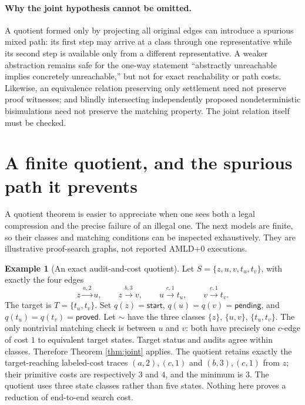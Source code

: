 \documentclass[11pt,letterpaper]{article}
\theoremstyle{definition}
\newtheorem{example}[theorem]{Example}
\begin{document}
\paragraph{Why the joint hypothesis cannot be omitted.} A quotient formed only by projecting all original edges can introduce a spurious mixed path: its first step may arrive at a class through one representative while its second step is available only from a different representative. A weaker abstraction remains safe for the one-way statement ``abstractly unreachable implies concretely unreachable,'' but not for exact reachability or path costs. Likewise, an equivalence relation preserving only settlement need not preserve proof witnesses; and blindly intersecting independently proposed nondeterministic bisimulations need not preserve the matching property. The joint relation itself must be checked.

\section{A finite quotient, and the spurious path it prevents}\label{sec:finite-case}
A quotient theorem is easier to appreciate when one sees both a legal compression and the precise failure of an illegal one. The next models are finite, so their classes and matching conditions can be inspected exhaustively. They are illustrative proof-search graphs, not reported AMLD+0 executions.

\begin{example}[An exact audit-and-cost quotient]\label{ex:finite-positive}
Let $S=\{z,u,v,t_u,t_v\}$, with exactly the four edges
\[
 z\xrightarrow{a,2}u,\qquad z\xrightarrow{b,3}v,
 \qquad u\xrightarrow{c,1}t_u,\qquad v\xrightarrow{c,1}t_v.
\]
The target is $T=\{t_u,t_v\}$. Set $q(z)=\mathsf{start}$, $q(u)=q(v)=\mathsf{pending}$, and $q(t_u)=q(t_v)=\mathsf{proved}$. Let $\sim$ have the three classes $\{z\}$, $\{u,v\}$, $\{t_u,t_v\}$. The only nontrivial matching check is between $u$ and $v$: both have precisely one $c$-edge of cost $1$ to equivalent target states. Target status and audits agree within classes. Therefore Theorem \ref{thm:joint} applies. The quotient retains exactly the target-reaching labeled-cost traces $(a,2),(c,1)$ and $(b,3),(c,1)$ from $z$; their primitive costs are respectively $3$ and $4$, and the minimum is $3$. The quotient uses three state classes rather than five states. Nothing here proves a reduction of end-to-end search cost.
\end{example}
\end{document}
